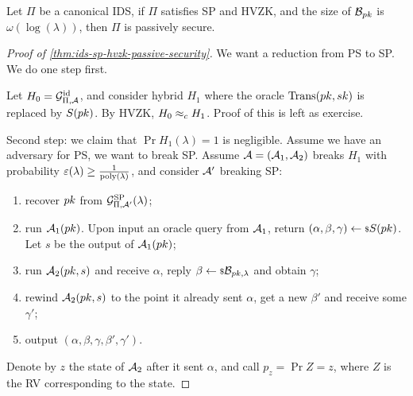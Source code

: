 \begin{theorem} \label{thm:ids-sp-hvzk-passive-security}
	Let $\Pi$ be a canonical \ac{IDS}, if $\Pi$ satisfies \ac{SP} and \ac{HVZK}, and the size of $\mathcal{B}_{pk}$ is $\omega(\log(\lambda))$, then $\Pi$ is passively secure.
\end{theorem}

\begin{proof}[Proof of \cref{thm:ids-sp-hvzk-passive-security}]
	We want a reduction from \ac{PS} to \ac{SP}.
	We do one step first.

	Let $H_0 = \mathcal{G}^{\mathrm{id}}_{\Pi, \mathcal{A}}$, and consider hybrid $H_1$ where the oracle $\mathrm{Trans}(pk, sk)$ is replaced by $S(pk)$.
	By \ac{HVZK}, $H_0 \approx_c H_1$.
	Proof of this is left as exercise.

	Second step: we claim that $\Pr{H_1(\lambda) = 1}$ is negligible.
	Assume we have an adversary for \ac{PS}, we want to break \ac{SP}.
	Assume $\mathcal{A} = (\mathcal{A}_1, \mathcal{A}_2)$ breaks $H_1$ with probability $\varepsilon(\lambda) \ge \frac{1}{\mathrm{poly}(\lambda)}$, and consider $\mathcal{A}'$ breaking \ac{SP}:
	\begin{enumerate}
		\item recover $pk$ from $\mathcal{G}^{\mathrm{SP}}_{\Pi, \mathcal{A}'}(\lambda)$;
		\item run $\mathcal{A}_1(pk)$.
			Upon input an oracle query from $\mathcal{A}_1$, return $(\alpha, \beta, \gamma) \leftarrow {\scriptstyle \$} {S(pk)}$.
			Let $s$ be the output of $\mathcal{A}_1(pk)$;
		\item run $\mathcal{A}_2(pk, s)$ and receive $\alpha$, reply $\beta \leftarrow {\scriptstyle \$} {\mathcal{B}_{pk, \lambda}}$ and obtain $\gamma$;
		\item rewind $\mathcal{A}_2(pk, s)$ to the point it already sent $\alpha$, get a new $\beta'$ and receive some $\gamma'$;
		\item output $(\alpha, \beta, \gamma, \beta', \gamma')$.
	\end{enumerate}
	Denote by $z$ the state of $\mathcal{A}_2$ after it sent $\alpha$, and call $p_z = \Pr{Z = z}$, where $Z$ is the \ac{RV} corresponding to the state.


\end{proof}
